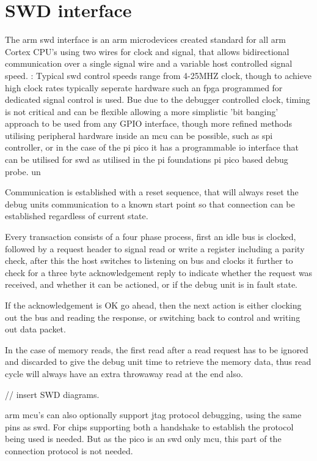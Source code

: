 \section{SWD interface}
The \gls{arm} \gls{swd} interface is an \gls{arm} microdevices created standard for all \gls{arm} Cortex CPU's using two wires for clock and signal, that allows bidirectional communication over a single signal wire and a variable host controlled signal speed.
:
Typical \gls{swd} control speeds range from 4-25MHZ clock, though to achieve high clock rates typically seperate hardware such an \gls{fpga} programmed for dedicated signal control is used. Bue due to the debugger controlled clock, timing is not critical and can be flexible allowing a more simplistic 'bit banging' approach to be used from any GPIO interface, though more refined methods utilising peripheral hardware inside an \gls{mcu} can be possible, such as \gls{spi} controller, or in the case of the pi pico it has a programmable io interface that can be utilised for \gls{swd} as utilised in the pi foundations pi pico based debug probe. un

Communication is established with a reset sequence, that will always reset the debug units communication to a known start point so that connection can be established regardless of current state.

Every transaction consists of a four phase process, first an idle bus is clocked, followed by a request header to signal read or write a register including a parity check, after this the host switches to listening on bus and clocks it further to check for a three byte acknowledgement reply to indicate whether the request was received, and whether it can be actioned, or if the debug unit is in fault state.

If the acknowledgement is OK go ahead, then the next action is either clocking out the bus and reading the response, or switching back to control and writing out data packet.

In the case of memory reads, the first read after a read request has to be ignored and discarded to give the debug unit time to retrieve the memory data, thus read cycle will always have an extra throwaway read at the end also.

// insert SWD diagrams.

\gls{arm} \gls{mcu}'s can also optionally support \gls{jtag} protocol debugging, using the same pins as \gls{swd}. For chips supporting both a handshake to establish the protocol being used is needed. But as the pico is an \gls{swd} only \gls{mcu}, this part of the connection protocol is not needed.

